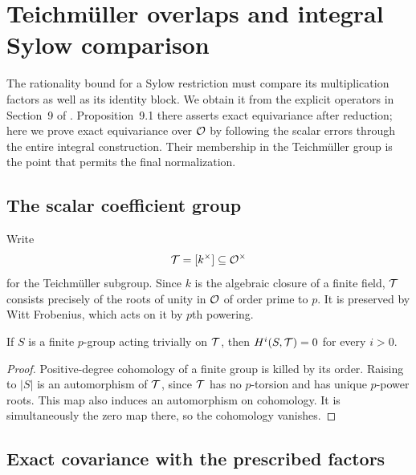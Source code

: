 \section{Teichm\"uller overlaps and integral Sylow comparison}
\label{sec:comparison}

The rationality bound for a Sylow restriction must compare its
multiplication factors as well as its identity block.  We obtain it
from the explicit operators in Section~9 of
\cite{OpenAIFieldDonovan2026}.  Proposition~9.1 there asserts exact
equivariance after reduction; here we prove exact equivariance over
$\mathcal O$ by following the scalar errors through the entire integral
construction.  Their membership in the Teichm\"uller group is the
point that permits the final normalization.

\subsection{The scalar coefficient group}

Write
\[
 \mathcal T=[k^\times]\subseteq\mathcal O^\times
\]
for the Teichm\"uller subgroup.  Since $k$ is the algebraic closure
of a finite field, $\mathcal T$ consists precisely of the roots of unity
in $\mathcal O$ of order prime to $p$.  It is preserved by Witt Frobenius,
which acts on it by $p$th powering.

\begin{lemma}\label{lem:teich-cohomology}
If $S$ is a finite $p$-group acting trivially on $\mathcal T$, then
$H^i(S,\mathcal T)=0$ for every $i>0$.
\end{lemma}

\begin{proof}
Positive-degree cohomology of a finite group is killed by its
order.  Raising to $|S|$ is an automorphism of $\mathcal T$, since $\mathcal T$
has no $p$-torsion and has unique $p$-power roots.  This map also
induces an automorphism on cohomology.  It is simultaneously the
zero map there, so the cohomology vanishes.
\end{proof}

\subsection{Exact covariance with the prescribed factors}

